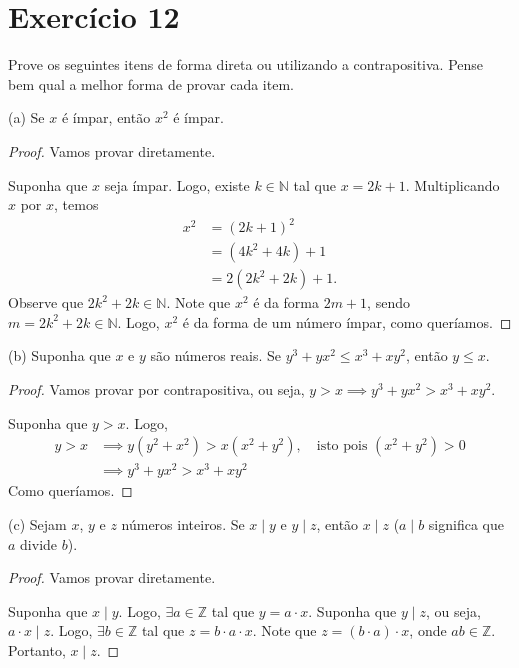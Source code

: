 \documentclass{article}
\begin{document}
\section*{Exercício 12}

Prove os seguintes itens de forma direta ou utilizando a contrapositiva.
Pense bem qual a melhor forma de provar cada item.

(a) Se $x$ é ímpar, então $x^2$ é ímpar.
\begin{proof}
Vamos provar diretamente.

Suponha que $x$ seja ímpar.
Logo, existe $k \in \mathbb{N}$ tal que $x = 2k + 1$.
Multiplicando $x$ por $x$, temos
\begin{align*}
    x^2 &= (2k + 1)^2\\
    &= (4k^2 + 4k) + 1\\
    &= 2(2k^2 + 2k) + 1 .
\end{align*}
Observe que $2k^2 + 2k \in \mathbb{N}$.
Note que $x^2$ é da forma $2m + 1$, sendo $m = 2k^2 + 2k \in \mathbb{N}$.
Logo, $x^2$ é da forma de um número ímpar, como queríamos.

\end{proof}

(b) Suponha que $x$ e $y$ são números reais. Se $y^3 + yx^2 \leq x^3 + xy^2$, então $y \leq x$.
\begin{proof}
Vamos provar por contrapositiva, ou seja, $y > x \implies y^3 + yx^2 > x^3 + xy^2$.

Suponha que $y > x$.
Logo,
\begin{align*}
    y > x &\implies y(y^2 + x^2) > x(x^2 + y^2) , \quad \mbox{isto pois }(x^2 + y^2) > 0\\
    &\implies y^3 + yx^2 > x^3 + xy^2
\end{align*}
Como queríamos.
\end{proof}

(c) Sejam $x$, $y$ e $z$ números inteiros. Se $x \mid y$ e $y \mid z$, então $x \mid z$ ($a \mid b$ significa que $a$ divide $b$).

\begin{proof}
Vamos provar diretamente.

Suponha que $x \mid y$.
Logo, $\exists a \in \mathbb{Z}$ tal que $y = a \cdot x$.
Suponha que $y \mid z$, ou seja, $a \cdot x \mid z$.
Logo, $\exists b \in \mathbb{Z}$ tal que $z = b \cdot a \cdot x$.
Note que $z = (b \cdot a) \cdot x$, onde $ab \in \mathbb{Z}$.
Portanto, $x \mid z$.

\end{proof}
\end{document}
